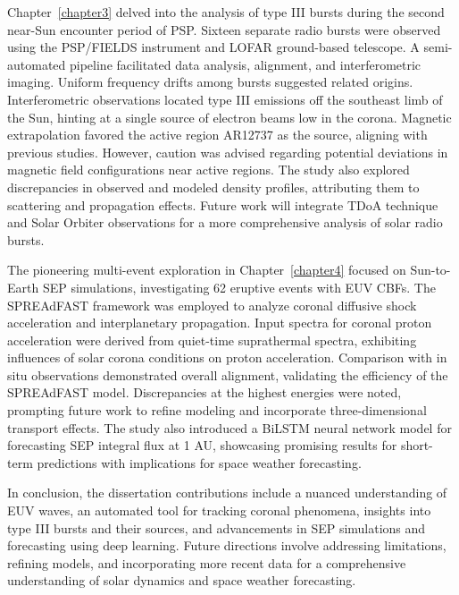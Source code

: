 Chapter~\ref{chapter3} delved into the analysis of type III bursts during the second near-Sun encounter period of PSP. Sixteen separate radio bursts were observed using the PSP/FIELDS instrument and LOFAR ground-based telescope. A semi-automated pipeline facilitated data analysis, alignment, and interferometric imaging. Uniform frequency drifts among bursts suggested related origins. Interferometric observations located type III emissions off the southeast limb of the Sun, hinting at a single source of electron beams low in the corona. Magnetic extrapolation favored the active region AR12737 as the source, aligning with previous studies. However, caution was advised regarding potential deviations in magnetic field configurations near active regions. The study also explored discrepancies in observed and modeled density profiles, attributing them to scattering and propagation effects. Future work will integrate TDoA technique and Solar Orbiter observations for a more comprehensive analysis of solar radio bursts.

The pioneering multi-event exploration in Chapter~\ref{chapter4} focused on Sun-to-Earth SEP simulations, investigating 62 eruptive events with EUV CBFs. The SPREAdFAST framework was employed to analyze coronal diffusive shock acceleration and interplanetary propagation. Input spectra for coronal proton acceleration were derived from quiet-time suprathermal spectra, exhibiting influences of solar corona conditions on proton acceleration. Comparison with in situ observations demonstrated overall alignment, validating the efficiency of the SPREAdFAST model. Discrepancies at the highest energies were noted, prompting future work to refine modeling and incorporate three-dimensional transport effects. The study also introduced a BiLSTM neural network model for forecasting SEP integral flux at 1 AU, showcasing promising results for short-term predictions with implications for space weather forecasting.

In conclusion, the dissertation contributions include a nuanced understanding of EUV waves, an automated tool for tracking coronal phenomena, insights into type III bursts and their sources, and advancements in SEP simulations and forecasting using deep learning. Future directions involve addressing limitations, refining models, and incorporating more recent data for a comprehensive understanding of solar dynamics and space weather forecasting.

